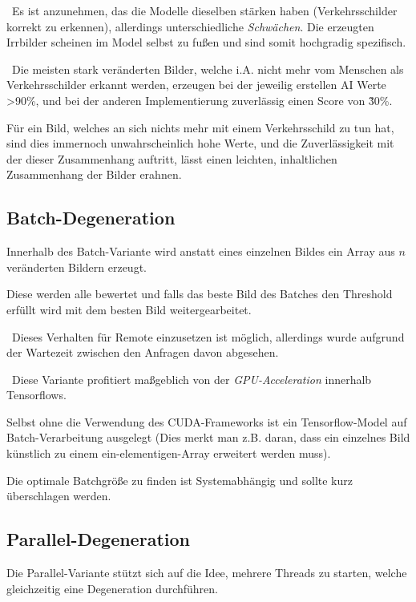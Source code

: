 ~\newline Es ist anzunehmen, das die Modelle dieselben stärken haben (Verkehrsschilder korrekt zu erkennen), allerdings unterschiedliche \textit{Schwächen}. Die erzeugten Irrbilder scheinen im Model selbst zu fußen und sind somit hochgradig spezifisch. 

~\newline Die meisten stark veränderten Bilder, welche i.A. nicht mehr vom Menschen als Verkehrsschilder erkannt werden, erzeugen bei der jeweilig erstellen AI Werte >90\%, und bei der anderen Implementierung zuverlässig einen Score von \~30\%. 

Für ein Bild, welches an sich nichts mehr mit einem Verkehrsschild zu tun hat, sind dies immernoch unwahrscheinlich hohe Werte, und die Zuverlässigkeit mit der dieser Zusammenhang auftritt, lässt einen leichten, inhaltlichen Zusammenhang der Bilder erahnen.

\newpage
\subsection{Batch-Degeneration}
Innerhalb des Batch-Variante wird anstatt eines einzelnen Bildes ein Array aus $n$ veränderten Bildern erzeugt. 

Diese werden alle bewertet und falls das beste Bild des Batches den Threshold erfüllt wird mit dem besten Bild weitergearbeitet. 

~\newline Dieses Verhalten für Remote einzusetzen ist möglich, allerdings wurde aufgrund der Wartezeit zwischen den Anfragen davon abgesehen. 

~\newline Diese Variante profitiert maßgeblich von der \textit{GPU-Acceleration} innerhalb Tensorflows. 

Selbst ohne die Verwendung des CUDA-Frameworks ist ein Tensorflow-Model auf Batch-Verarbeitung ausgelegt  (Dies merkt man z.B. daran, dass ein einzelnes Bild künstlich zu einem ein-elementigen-Array erweitert werden muss). 

Die optimale Batchgröße zu finden ist Systemabhängig und sollte kurz überschlagen werden. 
\subsection{Parallel-Degeneration}
Die Parallel-Variante stützt sich auf die Idee, mehrere Threads zu starten, welche gleichzeitig eine Degeneration durchführen.

